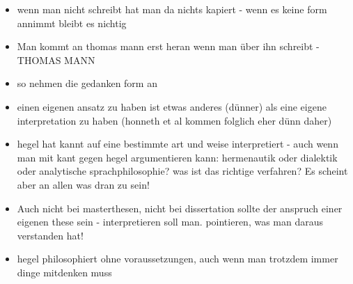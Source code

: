 \documentclass[emulatestandardclasses]{scrartcl}
\begin{document}
\begin{itemize}
  \item wenn man nicht schreibt hat man da nichts kapiert - wenn es keine form annimmt bleibt es nichtig
  \item Man kommt an thomas mann erst heran wenn man über ihn schreibt - THOMAS MANN
  \item so nehmen die gedanken form an
  \item einen eigenen ansatz zu haben ist etwas anderes (dünner) als eine eigene interpretation zu haben (honneth et al kommen folglich eher dünn daher)
  \item hegel hat kannt auf eine bestimmte art und weise interpretiert - auch wenn man mit kant gegen hegel argumentieren kann: hermenautik oder dialektik oder analytische sprachphilosophie? was ist das richtige verfahren? Es scheint aber an allen was dran zu sein!
  \item Auch nicht bei masterthesen, nicht bei dissertation sollte der anspruch einer eigenen these sein - interpretieren soll man. pointieren, was man daraus verstanden hat!
  \item hegel philosophiert ohne voraussetzungen, auch wenn man trotzdem immer dinge mitdenken muss
\end{itemize}
\end{document}
